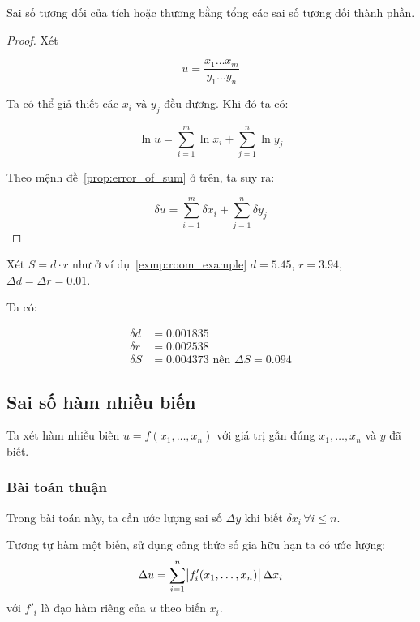 \documentclass[../../Lectures.tex]{subfiles}
\begin{document}
\begin{proposition}
    Sai số tương đối của tích hoặc thương bằng tổng các sai số tương đối thành
    phần.
\end{proposition}

\begin{proof}
    Xét

    \[u = \frac{x_1 \ldots x_m}{y_1 \ldots y_n}\]

    Ta có thể giả thiết các \(x_i\) và \(y_j\) đều dương. Khi đó ta có:

    \[\ln{u} = \sum_{i=1}^{m} \ln{x_i} + \sum_{j=1}^{n} \ln{y_j}\]

    Theo mệnh đề~\ref{prop:error_of_sum} ở trên, ta suy ra:

    \[\delta u = \sum_{i=1}^{m} \delta x_i + \sum_{j=1}^{n} \delta y_j\]
\end{proof}

\begin{exmp}
    Xét \(S = d \cdot r\) như ở ví dụ~\ref{exmp:room_example} \(d =
    \num{5.45}\), \(r = \num{3.94}\), \(\Delta d = \Delta r = \num{0.01}\).

    Ta có:

    \begin{align*}
        \delta d &= \num{0.001835} \\
        \delta r &= \num{0.002538} \\
        \delta S &= \num{0.004373} \text{ nên } \Delta S = \num{0.094}
    \end{align*}
\end{exmp}

\subsection{Sai số hàm nhiều biến}

Ta xét hàm nhiều biến \(u = f(x_1, \ldots, x_n)\) với giá trị gần đúng \(x_1,
\ldots, x_n\) và \(y\) đã biết.

\subsubsection{Bài toán thuận}

Trong bài toán này, ta cần ước lượng sai số \(\Delta y\) khi biết \(\delta x_i
\, \forall i \leq n\).    %

Tương tự hàm một biến, sử dụng công thức số gia hữu hạn ta có ước lượng:
\begin{equation} \label{eq:absolute_error_of_function}
    \Delta u = \sum_{i=1}^{n} \abs{f'_i(x_1, \ldots, x_n)} \Delta x_i
\end{equation}
với \(f'_i\) là đạo hàm riêng của \(u\) theo biến \(x_i\).
\end{document}

